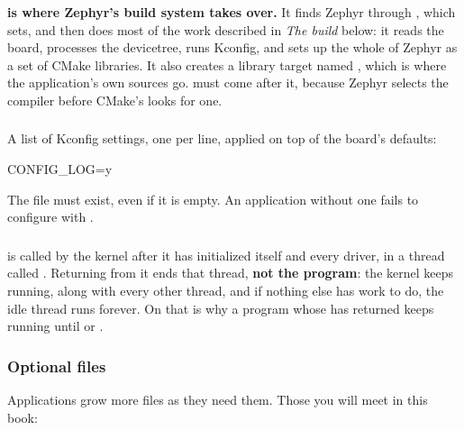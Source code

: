 \noindent \textbf{ is where Zephyr’s build system takes over.} It finds
Zephyr through , which  sets, and then does most of the work
described in \emph{The build} below: it reads the board, processes the devicetree, runs Kconfig, and
sets up the whole of Zephyr as a set of CMake libraries. It also creates a library target named
\textbf{}, which is where the application’s own sources go.  must come
after it, because Zephyr selects the compiler before CMake’s  looks for one.

\subsubsection{}
A list of Kconfig settings, one per line, applied on top of the board’s defaults:

\begin{kconfigcode}
CONFIG_LOG=y
\end{kconfigcode}

\noindent The file must exist, even if it is empty. An application without one fails to configure
with .

\subsubsection{}
 is called by the kernel after it has initialized itself and every driver, in a thread
called . Returning from it ends that thread, \textbf{not the program}: the kernel keeps
running, along with every other thread, and if nothing else has work to do, the idle thread runs
forever. On  that is why a program whose  has returned keeps running
until  or .

\subsubsection{Optional files}
Applications grow more files as they need them. Those you will meet in this book:

